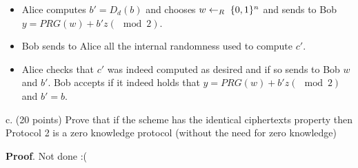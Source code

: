 \documentclass{article}
\begin{document}
\begin{enumerate}
\begin{itemize}
\begin{itemize}
\item{}
Alice computes $b'=D_d(b)$ and chooses $w\leftarrow_R\;\{0,1\}^n$ and sends to Bob $y=PRG(w)+ b'z (\mod 2)$.%

\item{}
Bob sends to Alice all the internal randomness used to compute $c'$.%

\item{}
Alice checks that $c'$ was indeed computed as desired and if so sends to Bob $w$ and $b'$. Bob accepts if it indeed holds that $y=PRG(w)+b'z (\mod 2)$ and $b'=b$.%
\end{itemize}%

c. (20 points) Prove that if the scheme has the identical ciphertexts property then Protocol 2 is a zero knowledge protocol (without the need for zero knowledge)%

\begin{mdbmarginx}{1ex}{0pt}{1ex}{0pt}%
\noindent{}\textbf{Proof}.  Not done :(%
\end{mdbmarginx}%
\end{itemize}%


\end{enumerate}
\end{document}
